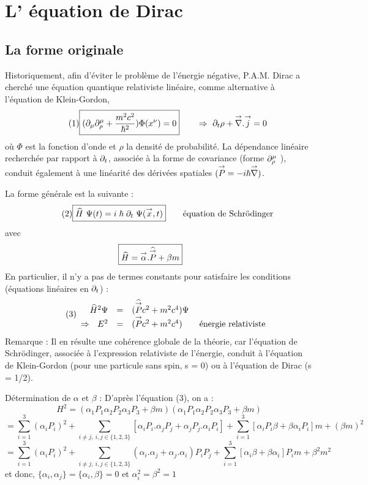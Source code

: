 \section{L' équation de Dirac}
\subsection{La forme originale}
Historiquement, afin d’éviter le problème de l’énergie négative, P.A.M. Dirac a
cherché une équation quantique relativiste linéaire, comme alternative à
l’équation de Klein-Gordon,
\[
\tag{1} \boxed{(\partial_\mu\partial_\rho^\mu+\frac{m^2c^2}{\hbar^2})\Phi(x^\nu)=0
} \qquad \Rightarrow\ \partial_t\rho+{\overset{\rightarrow}{\nabla}}.{\overset{\rightarrow}{j}}=0
\]
où $\Phi$ est la fonction d'onde et $\rho$ la densité de probabilité. La
dépendance linéaire recherchée par rapport à $\partial_t$, associée à la forme
de covariance (forme $\partial_\rho^\mu$ ), conduit également à une linéarité des
dérivées spatiales $({\overset{\rightarrow}{P}}=-i\hbar{\overset{\rightarrow}{\nabla}})$.

La forme générale est la suivante :
\[
\tag{2} \boxed{\widehat{H}\ \Psi(t)={i}\;{\hbar}\;\partial_t\;\Psi({\overset{\rightarrow}{x}},t)
} \qquad \text{équation de Schrödinger}
\]
avec
\[
\boxed{\wt{H}=\mv{\alpha}.\wt{\mv{P}}+\beta m} \qquad%
\]
En particulier, il n’y a pas de termes constants pour satisfaire les conditions
(équations
linéaires en $\partial_t$) :
\[
\tag{3}
\begin{array}{ r c l }
 \widehat{H}^2\Psi & = & (\widehat{{\overset{\rightarrow}{P}}}c^2+m^2c^4)\Psi \\
 \Rightarrow\ \ E^2 & = & ({\overset{\rightarrow}{P}}c^2+m^2c^4) \qquad \text{énergie relativiste}
\end{array}
\]
Remarque : Il en résulte une cohérence globale de la théorie, car l’équation de
Schrödinger, associée à l’expression relativiste de l’énergie, conduit à
l’équation de Klein-Gordon (pour une particule sans spin, s = 0) ou à
l’équation de Dirac (s = 1/2).

Détermination de $\alpha$ et $\beta$ : D’après l’équation (3), on a :
\[
H^2=(\alpha_1P_1\alpha_2P_2\alpha_3P_3+\beta m)
(\alpha_1P_1\alpha_2P_2\alpha_3P_3+\beta m)
\]
\[
=\sum_{i=1}^3(\alpha_iP_i)^2+\sum_{i\neq j,\ i,j\in\{1,2,3\}}\left[
\alpha_iP_i.\alpha_jP_j+\alpha_jP_j.\alpha_iP_i\right]+
\sum_{i=1}^3\left[
\alpha_iP_i\beta+\beta\alpha_iP_i\right]m+(\beta m)^2
\]
\[
=\sum_{i=1}^3(\alpha_iP_i)^2+\sum_{i\neq j,\ i,j\in\{1,2,3\}}
(\alpha_i.\alpha_j+\alpha_j.\alpha_i)P_iP_j+
\sum_{i=1}^3\left[
\alpha_i\beta+\beta\alpha_i\right]P_im+\beta^2m^2
\]
et donc, $\{\alpha_i,\alpha_j\}=\{\alpha_i,\beta\}=0$
et $\alpha_i^2=\beta^2=1$

